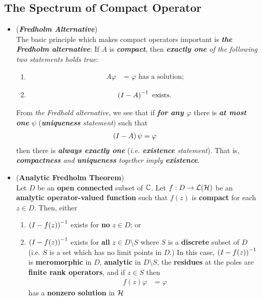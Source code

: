 \documentclass[11pt]{article}
\begin{document}
\subsection{The Spectrum of Compact Operator}
\begin{itemize}
\item \begin{remark} (\emph{\textbf{Fredholm Alternative}})\\
The basic principle which makes compact operators important is \emph{\textbf{the Fredholm alternative}}: If $A$ is \emph{\textbf{compact}}, then \emph{\textbf{exactly one} of the following two statements holds true}:
\begin{enumerate}
\item 
\begin{align*}
A \varphi&= \varphi \text{ has a solution;}
\end{align*} 
\item 
\begin{align*}
\left(I - A\right)^{-1} \text{ exists.}
\end{align*} 
\end{enumerate}
From \emph{the Fredhold alternative}, we see that if \emph{\textbf{for any $\varphi$}} there is \emph{\textbf{at most one} $\psi$} (\emph{\textbf{uniqueness} statement}) such that
\begin{align*}
\left(I - A\right) \psi &= \varphi 
\end{align*} then there is \emph{\textbf{always exactly one}} (\emph{i.e. \textbf{existence} statement}). That is, \emph{\textbf{compactness} and \textbf{uniqueness}  together imply \textbf{existence}}.
\end{remark}

\item \begin{theorem} (\textbf{Analytic Fredholm Theorem}) \citep{reed1980methods} \\
Let $D$ be an \textbf{open connected} subset of ${\mathbb C}$. Let $f: D \rightarrow {\mathcal L}({\mathcal H})$ be an \textbf{analytic operator-valued function} such that $f(z)$ is \textbf{compact} for each $z \in D$. Then, either 
\begin{enumerate}
\item $\left(I - f(z)\right)^{-1}$  exists for \textbf{no} $z \in D$; or

\item $\left(I - f(z)\right)^{-1}$ exists for \textbf{all} $z \in D \setminus S$ where $S$  is a \textbf{discrete} subset of $D$ (i.e. $S$ is a set which has no limit points in $D$.)
In this case,  $\left(I - f(z)\right)^{-1}$ is \textbf{meromorphic} in $D$, \textbf{analytic} in $D \setminus S$, the \textbf{residues} at the poles are \textbf{finite rank operators}, and if $z \in S$ then
\begin{align*}
f(z)\varphi &= \varphi
\end{align*} has a \textbf{nonzero solution} in ${\mathcal H}$
\end{enumerate}
\end{theorem}


\end{itemize}
\end{document}
